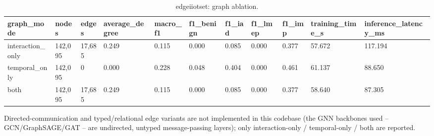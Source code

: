 \begin{table}[t]
\centering
\caption{edgeiiotset: graph ablation.}
\label{tab:edgeiiotset_graph_ablation}
\begin{tabular}{lllllllllll}
\toprule
graph\_mode & nodes & edges & average\_degree & macro\_f1 & f1\_benign & f1\_iad & f1\_lmep & f1\_imp & training\_time\_s & inference\_latency\_ms \\
\midrule
interaction\_only & 142,095 & 17,685 & 0.249 & 0.115 & 0.000 & 0.085 & 0.000 & 0.377 & 57.672 & 117.194 \\
temporal\_only & 142,095 & 0 & 0.000 & 0.228 & 0.048 & 0.404 & 0.000 & 0.461 & 61.137 & 88.650 \\
both & 142,095 & 17,685 & 0.249 & 0.115 & 0.000 & 0.085 & 0.000 & 0.377 & 58.640 & 87.305 \\
\bottomrule
\end{tabular}
\vspace{2pt}
\parbox{\linewidth}{\footnotesize Directed-communication and typed/relational edge variants are not implemented in this codebase (the GNN backbones used -- GCN/GraphSAGE/GAT -- are undirected, untyped message-passing layers); only interaction-only / temporal-only / both are reported.}
\end{table}
